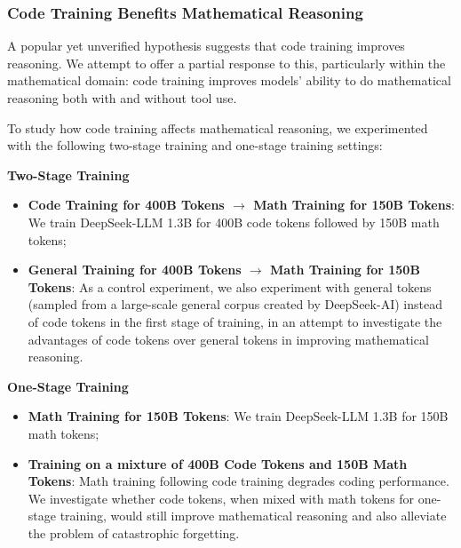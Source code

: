 \subsubsection{Code Training Benefits Mathematical Reasoning}

A popular yet unverified hypothesis suggests that code training improves reasoning.
We attempt to offer a partial response to this, particularly within the mathematical domain:
code training improves models' ability to do mathematical reasoning both with and without tool use.

To study how code training affects mathematical reasoning, we experimented with the following two-stage training and one-stage training settings:

\noindent
\textbf{Two-Stage Training} 
\begin{itemize}[topsep=0pt]
    \item \textbf{Code Training for 400B Tokens $\rightarrow$ Math Training for 150B Tokens}:
    We train DeepSeek-LLM 1.3B for 400B code tokens followed by 150B math tokens;
    \item \textbf{General Training for 400B Tokens $\rightarrow$ Math Training for 150B Tokens}:
    As a control experiment, we also experiment with general tokens (sampled from a large-scale general corpus created by DeepSeek-AI) instead of code tokens in the first stage of training, in an attempt to investigate the advantages of code tokens over general tokens in improving mathematical reasoning.
\end{itemize}

\noindent
\textbf{One-Stage Training}
\begin{itemize}[topsep=0pt]
    \item \textbf{Math Training for 150B Tokens}:
    We train DeepSeek-LLM 1.3B for 150B math tokens;
    \item \textbf{Training on a mixture of 400B Code Tokens and 150B Math Tokens}:
    Math training following code training degrades coding performance.
    We investigate whether code tokens, when mixed with math tokens for one-stage training, would still improve mathematical reasoning and also alleviate the problem of catastrophic forgetting.
\end{itemize}

\begingroup
\setlength{\tabcolsep}{3pt} 
\renewcommand{\arraystretch}{1} 

\endgroup

\begingroup
\setlength{\tabcolsep}{3pt} 
\renewcommand{\arraystretch}{1} 

